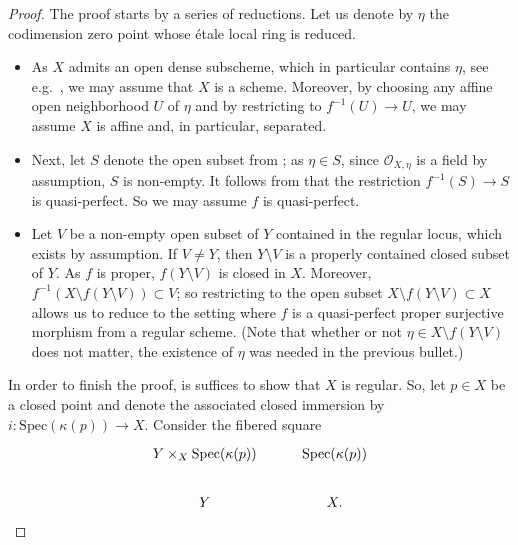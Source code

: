 \documentclass[11pt]{amsart}
\theoremstyle{plain}
\theoremstyle{definition}
\numberwithin{equation}{section}
\numberwithin{theorem}{section}
\begin{document}
\begin{proof}
    The proof starts by a series of reductions.
    Let us denote by $\eta$ the codimension zero point whose \'{e}tale local ring is reduced. 
    \begin{itemize}
        \item As $X$ admits an open dense subscheme, which in particular contains $\eta$, see e.g.\ \cite[\href{https://stacks.math.columbia.edu/tag/06NH}{Tag 06NH}]{StacksProject}, we may assume that $X$ is a scheme.
        Moreover, by choosing any affine open neighborhood $U$ of $\eta$ and by restricting to $f^{-1}(U)\to U$, we may assume $X$ is affine and, in particular, separated.
        \item Next, let $S$ denote the open subset from ; as $\eta\in S$, since $\mathcal{O}_{X,\eta}$ is a field by assumption, $S$ is non-empty.
        It follows from  that the restriction $f^{-1}(S)\to S$ is quasi-perfect. So we may assume $f$ is quasi-perfect. 
        \item Let $V$ be a non-empty open subset of $Y$ contained in the regular locus, which exists by assumption. 
        If $V\neq Y$, then $Y\setminus V$ is a properly contained closed subset of $Y$. 
        As $f$ is proper, $f(Y\setminus V)$ is closed in $X$. 
        Moreover, $f^{-1}(X\setminus f(Y\setminus V))\subset V$; so restricting to the open subset $X\setminus f(Y\setminus V) \subset X$ allows us to reduce to the setting where $f$ is a quasi-perfect proper surjective morphism from a regular scheme.
        (Note that whether or not $\eta\in X\setminus f(Y\setminus V)$ does not matter, the existence of $\eta$ was needed in the previous bullet.)
    \end{itemize}
    In order to finish the proof, is suffices to show that $X$ is regular. So, let $p\in X$ be a closed point and denote the associated closed immersion by $i\colon \mathrm{Spec}(\kappa(p)) \to X$. 
    Consider the fibered square
    \begin{displaymath}
        \begin{tikzcd}
            {Y\times_X \operatorname{Spec}(\kappa(p))} & {\operatorname{Spec}(\kappa(p))} \\
            Y & {X.}

\end{tikzcd}
\end{displaymath}
\end{proof}
\end{document}
